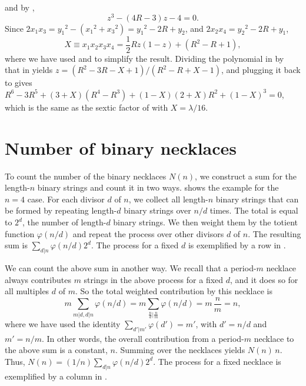 \documentclass[twocolumn]{revtex4-1}
\begin{document}
%
and by ,
\begin{equation}
  z^3 - (4 R - 3) z - 4 = 0.
  \label{eq:xr4s}
\end{equation}
%
%
Since $2 x_1 x_3 = {y_1}^2 - ({x_1}^2 + {x_3}^2) = {y_1}^2 - 2 R + y_2$,
and $2 x_2 x_4 = {y_2}^2 - 2 R + y_1$,
%
\begin{equation}
  X \equiv x_1 x_2 x_3 x_4 = \frac{1}{2} R z(1 - z) + (R^2 - R + 1),
\label{eq:der4}
\end{equation}
where we have used  and  to simplify the result.
%
Dividing the polynomial in  by that in 
yields $z = (R^2-3R-X+1)/(R^2-R+X-1)$,
and plugging it back to  gives
   $R^6 -3 R^5
  + (3 + X) (R^4 - R^3)
  + (1 - X) (2 + X) R^2
  + (1 - X)^3 = 0$,
which is the same as the sextic factor of 
  with $X = \lambda/16$.




\section{\label{apd:bnecklace}Number of binary necklaces}




To count the number of the binary necklaces $N(n)$,
we construct a sum for the length-$n$ binary strings and count it in two ways.
 shows the example for the $n=4$ case.
%
For each divisor $d$ of $n$, we collect
  all length-$n$ binary strings
  that can be formed by repeating
  length-$d$ binary strings over $n/d$ times.
%
The total is equal to $2^d$, the number of length-$d$ binary strings.
%
We then weight them by the totient function $\varphi(n/d)$
%
and repeat the process over other divisors $d$ of $n$.
%
The resulting sum is $\sum_{d|n} \varphi(n/d) 2^d$.
%
The process for a fixed $d$ is exemplified
  by a row in .
%


We can count the above sum in another way.
We recall that a period-$m$ necklace always contributes
  $m$ strings in the above process for a fixed $d$,
  and it does so for all multiples $d$ of $m$.
So the total weighted contribution by this necklace is
\begin{equation}
m \sum_{m|d, d|n} \varphi(n/d) =
 m \sum_{\frac{n}{d}|\frac{n}{m}} \varphi(n/d) = m \,  \frac{n}{m}  = n,
\label{eq:mphind}
\end{equation}
where we have used the identity $\sum_{d'|m'} \varphi(d') = m'$,
with $d' = n/d$ and $m' = n/m$.
%
In other words, the overall contribution from a period-$m$ necklace
  to the above sum is a constant, $n$.
%
Summing over the necklaces yields $N(n) \, n$. Thus,
$N(n) = (1/n) \sum_{d|n} \varphi(n/d) 2^d$.
The process for a fixed necklace is exemplified
  by a column in .
%
\end{document}
